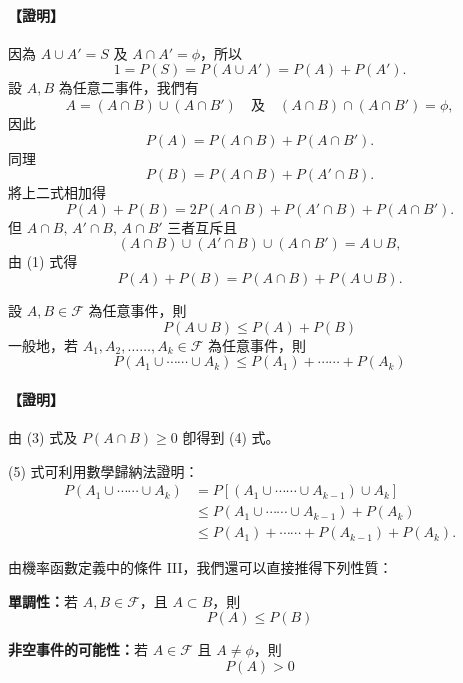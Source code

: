 \paragraph{【證明】}
因為 $A \cup A' = S$ 及 $A \cap A' = \phi$，所以
\[
1 = P(S) = P(A \cup A') = P(A) + P(A').
\]
設 $A, B$ 為任意二事件，我們有
\[
A = (A \cap B) \cup (A \cap B') \quad\text{及}\quad (A \cap B) \cap (A \cap B') = \phi,
\]
因此
\[
P(A) = P(A \cap B) + P(A \cap B').
\]
同理
\[
P(B) = P(A \cap B) + P(A' \cap B).
\]
將上二式相加得
\[
P(A) + P(B) = 2P(A \cap B) + P(A' \cap B) + P(A \cap B').
\]
但 $A \cap B,\, A' \cap B,\, A \cap B'$ 三者互斥且
\[
(A \cap B) \cup (A' \cap B) \cup (A \cap B') = A \cup B,
\]
由 (1) 式得
\[
P(A) + P(B) = P(A \cap B) + P(A \cup B). \tag*{\#}
\]

\medskip
\begin{corollary*}
設 $A, B \in \mathscr{F}$ 為任意事件，則
\begin{equation}
P(A \cup B) \le P(A) + P(B) \label{eq:b5s-ch4-4}
\end{equation}
一般地，若 $A_1, A_2, \dots\dots, A_k \in \mathscr{F}$ 為任意事件，則
\begin{equation}
P(A_1 \cup \cdots\cdots \cup A_k) \le P(A_1) + \cdots\cdots + P(A_k) \label{eq:b5s-ch4-5}
\end{equation}
\end{corollary*}
\paragraph{【證明】}
由 (3) 式及 $P(A \cap B) \ge 0$ 卽得到 (4) 式。

(5) 式可利用數學歸納法證明：
\begin{align*}
P(A_1 \cup \cdots\cdots \cup A_k) &= P[(A_1 \cup \cdots\cdots \cup A_{k-1}) \cup A_k] \\
&\le P(A_1 \cup \cdots\cdots \cup A_{k-1}) + P(A_k) \\
&\le P(A_1) + \cdots\cdots + P(A_{k-1}) + P(A_k). \tag*{\#}
\end{align*}

由機率函數定義中的條件 III，我們還可以直接推得下列性質：

\medskip
\noindent\textbf{單調性：}若 $A, B \in \mathscr{F}$，且 $A \subset B$，則
\begin{equation}
P(A) \le P(B) \label{eq:b5s-ch4-6}
\end{equation}

\noindent\textbf{非空事件的可能性：}若 $A \in \mathscr{F}$ 且 $A \neq \phi$，則
\begin{equation}
P(A) > 0 \label{eq:b5s-ch4-7}
\end{equation}

